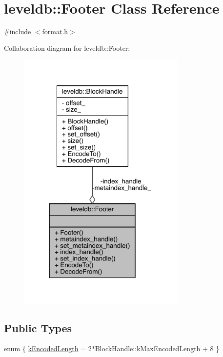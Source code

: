 \hypertarget{classleveldb_1_1_footer}{}\section{leveldb\+:\+:Footer Class Reference}
\label{classleveldb_1_1_footer}


{\ttfamily \#include $<$format.\+h$>$}



Collaboration diagram for leveldb\+:\+:Footer\+:\nopagebreak
\begin{figure}[H]
\begin{center}
\leavevmode
\includegraphics[width=237pt]{classleveldb_1_1_footer__coll__graph}
\end{center}
\end{figure}
\subsection*{Public Types}
\begin{DoxyCompactItemize}
\item 
enum \{ \hyperlink{classleveldb_1_1_footer_ab8cc3609a53377c12565691fdcd63d13a52c5b622f817edcfaf2bb274851a3791}{k\+Encoded\+Length} = 2$\ast$\+Block\+Handle\+:\+:k\+Max\+Encoded\+Length + 8
 \}
\end{DoxyCompactItemize}
